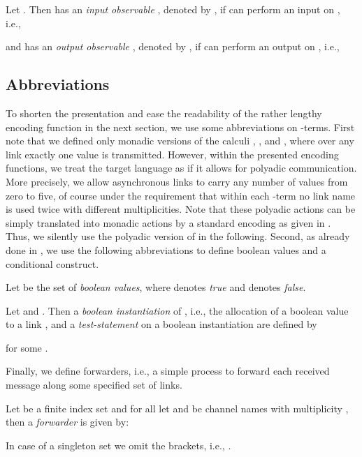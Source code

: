 \documentclass[]{llncs}
\begin{document}
\begin{definition}[Observable] \label{def:barb}
	Let . Then  has an \emph{input observable} , denoted by , if  can perform an input on , i.e.,
	
	and  has an \emph{output observable} , denoted by , if  can perform an output on , i.e.,
	
\end{definition}

\subsection{Abbreviations}
\label{sec:abbreviations}

To shorten the presentation and ease the readability of the rather lengthy encoding function in the next section, we use some abbreviations on \piAsyn-terms. 
First note that we defined only monadic versions of the calculi \piMix, \piSep, and \piAsyn, where over any link exactly one value is transmitted. However, within the presented encoding functions, we treat the target language \piAsyn as if it allows for polyadic communication. More precisely, we allow asynchronous links to carry any number of values from zero to five, of course under the requirement that within each \piAsyn-term no link name is used twice with different multiplicities. Note that these polyadic actions can be simply translated into monadic actions by a standard encoding as given in \cite{sangiorgiWalker01}. Thus, we silently use the polyadic version of \piAsyn in the following.
Second, as already done in \cite{nestmann00}, we use the following abbreviations to define boolean values and a conditional construct.

\begin{definition}
\label{def:testBoolean}
	Let  be the set of \emph{boolean values}, where  denotes \emph{true} and  denotes \emph{false}.
	
	Let  and . Then a \emph{boolean instantiation} of , i.e., the allocation of a boolean value to a link , and a \emph{test-statement} on a boolean instantiation are defined by
	
	for some .
\end{definition}

Finally, we define forwarders, i.e., a simple process to forward each received message along some specified set of links.

\begin{definition}[Forwarder]
\label{def:forwarder}
	Let  be a finite index set and for all  let  and  be channel names with multiplicity , then a \emph{forwarder} is given by:
	
	In case of a singleton set we omit the brackets, i.e., .
\end{definition}
\end{document}

